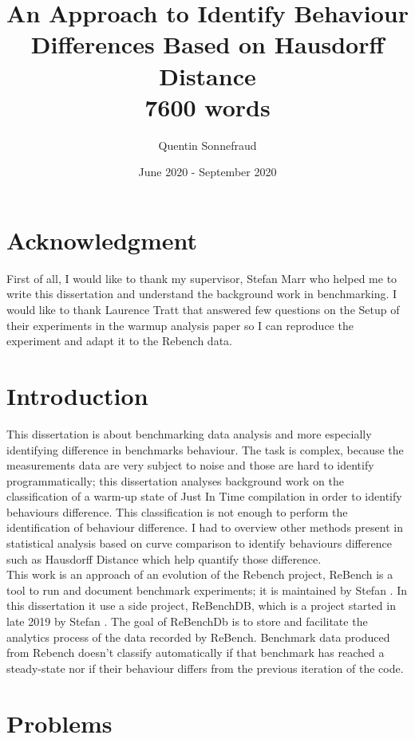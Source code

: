 \documentclass{article}
\title{An Approach to Identify Behaviour Differences Based on Hausdorff Distance \\ 7600 words}
\author{Quentin Sonnefraud}
\date{June 2020 - September 2020}
\begin{document}
\maketitle

\tableofcontents

\newpage

\section{Acknowledgment}


First of all, I would like to thank my  supervisor, Stefan Marr who helped me to write this dissertation and understand the background work in benchmarking. \newline
I would like to thank Laurence Tratt that answered few questions on the Setup of their experiments in the warmup analysis paper so I can reproduce the experiment and adapt it to the Rebench data.


\section{Introduction}

This dissertation is about benchmarking data analysis and more especially identifying difference in benchmarks behaviour. The task is complex, because the measurements data are very subject to noise and those are hard to identify programmatically; this dissertation analyses background work on the classification of a warm-up state of Just In Time compilation in order to identify behaviours difference. This classification is not enough to perform the identification of behaviour difference. I had to overview other methods present in statistical analysis based on curve comparison to identify behaviours difference such as Hausdorff Distance which help quantify those difference.\\
This work is an approach of an evolution of the Rebench project, ReBench is a tool to run and document benchmark experiments; it is maintained by Stefan \citeauthor{ReBench:2018}. In this dissertation it use a side project, ReBenchDB, which is a project started in late 2019 by Stefan \citeauthor{ReBench:2018}. The goal of ReBenchDb is to store and facilitate the analytics process of the data recorded by ReBench. Benchmark data produced from Rebench doesn't classify automatically if that benchmark has reached a steady-state nor if their behaviour differs from the previous iteration of the code.

\section{Problems}
\end{document}
